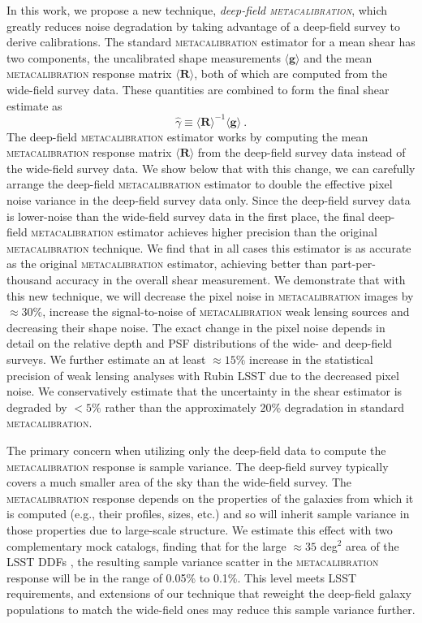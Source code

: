 \documentclass[twocolumn]{openjournal}
\makeatletter
\newcommand{\mcal}{\textsc{metacalibration}\@\xspace}
\makeatother
\begin{document}
In this work, we propose a new technique, \textit{deep-field \textsc{metacalibration}},
which greatly reduces noise degradation by taking advantage of a
deep-field survey to derive calibrations. The standard \mcal estimator for
a mean shear has two
components, the uncalibrated shape measurements $\langle \mathbf{g} \rangle$ and the
mean \mcal response matrix $\langle\mathbf{R}\rangle$, both of which are computed from
the wide-field survey data. These quantities are combined to form the final shear
estimate as
\citep{HuffMcal2017,SheldonMcal2017}
\begin{equation*}
\hat\gamma \equiv \langle\mathbf{R}\rangle^{-1}\langle \mathbf{g} \rangle\ .
\end{equation*}
The deep-field \mcal estimator works by computing the mean \mcal response matrix
$\langle\mathbf{R}\rangle$ from the deep-field survey data instead of the wide-field
survey data. We show below that with this change, we can carefully arrange the
deep-field \mcal estimator to double the effective pixel noise variance in the
deep-field survey data only. Since the deep-field survey data is lower-noise than the
wide-field survey data in the first place, the final deep-field \mcal estimator achieves
higher precision than the original \mcal technique. We find that in all cases this
estimator is as accurate as the original \mcal estimator, achieving better than
part-per-thousand accuracy in the overall shear measurement. We demonstrate that with
this new technique, we will decrease the pixel noise in \mcal images by $\approx30\%$,
increase the signal-to-noise of \mcal weak lensing sources and decreasing their shape noise.
The exact change in the pixel noise depends in detail on the relative depth and PSF
distributions of the wide- and deep-field surveys. We further estimate an at least
$\approx15\%$ increase in the statistical precision of weak lensing analyses with
Rubin LSST due to the decreased pixel noise. We conservatively estimate that the
uncertainty in the shear estimator
is degraded by $<5\%$ rather than the approximately 20\% degradation in
standard \mcal.

The primary concern when utilizing only the deep-field data to compute the \mcal
response is sample variance. The deep-field survey typically covers a much smaller
area of the sky than the wide-field survey. The \mcal response depends on the properties
of the galaxies from which it is computed (e.g., their profiles, sizes, etc.) and so
will inherit sample variance in those properties due to large-scale structure. We
estimate this effect with two complementary mock catalogs, finding that for the large
$\approx35$ deg$^2$ area of the LSST DDFs \citep{lsst-ddf-design,ivezic2019lsst}, the
resulting sample variance scatter in the \mcal response will be in the range of 0.05\%
to 0.1\%. This level meets LSST requirements, and extensions of our technique that
reweight the deep-field galaxy populations to match the wide-field ones may reduce this
sample variance further.
\end{document}
